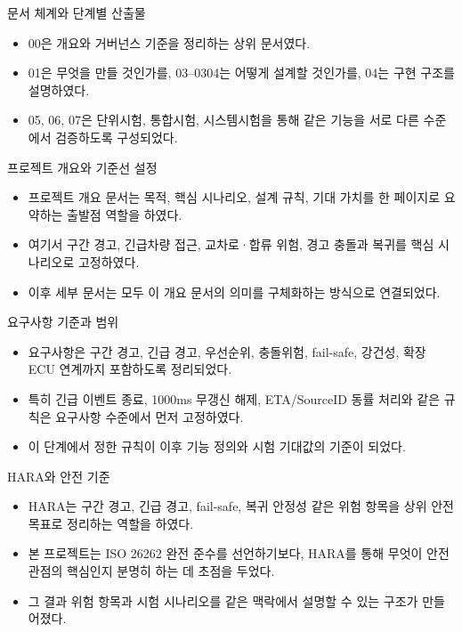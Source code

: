 \documentclass[aspectratio=169,10pt]{beamer}
\begin{document}
\begin{frame}{문서 체계와 단계별 산출물}
\begin{itemize}
  \item 00은 개요와 거버넌스 기준을 정리하는 상위 문서였다.
  \item 01은 무엇을 만들 것인가를, 03--0304는 어떻게 설계할 것인가를, 04는 구현 구조를 설명하였다.
  \item 05, 06, 07은 단위시험, 통합시험, 시스템시험을 통해 같은 기능을 서로 다른 수준에서 검증하도록 구성되었다.
\end{itemize}
\end{frame}

\begin{frame}{프로젝트 개요와 기준선 설정}
\begin{itemize}
  \item 프로젝트 개요 문서는 목적, 핵심 시나리오, 설계 규칙, 기대 가치를 한 페이지로 요약하는 출발점 역할을 하였다.
  \item 여기서 구간 경고, 긴급차량 접근, 교차로·합류 위험, 경고 충돌과 복귀를 핵심 시나리오로 고정하였다.
  \item 이후 세부 문서는 모두 이 개요 문서의 의미를 구체화하는 방식으로 연결되었다.
\end{itemize}
\end{frame}

\begin{frame}{요구사항 기준과 범위}
\begin{itemize}
  \item 요구사항은 구간 경고, 긴급 경고, 우선순위, 충돌위험, fail-safe, 강건성, 확장 ECU 연계까지 포함하도록 정리되었다.
  \item 특히 긴급 이벤트 종료, 1000ms 무갱신 해제, ETA/SourceID 동률 처리와 같은 규칙은 요구사항 수준에서 먼저 고정하였다.
  \item 이 단계에서 정한 규칙이 이후 기능 정의와 시험 기대값의 기준이 되었다.
\end{itemize}
\end{frame}

\begin{frame}{HARA와 안전 기준}
\begin{itemize}
  \item HARA는 구간 경고, 긴급 경고, fail-safe, 복귀 안정성 같은 위험 항목을 상위 안전 목표로 정리하는 역할을 하였다.
  \item 본 프로젝트는 ISO 26262 완전 준수를 선언하기보다, HARA를 통해 무엇이 안전 관점의 핵심인지 분명히 하는 데 초점을 두었다.
  \item 그 결과 위험 항목과 시험 시나리오를 같은 맥락에서 설명할 수 있는 구조가 만들어졌다.
\end{itemize}
\end{frame}
\end{document}
